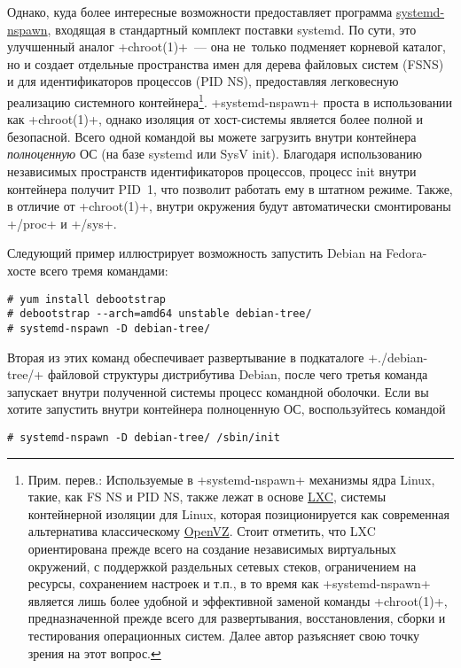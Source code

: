 \documentclass[10pt,oneside,a4paper]{article}
\begin{document}
Однако, куда более интересные возможности предоставляет программа
\href{http://0pointer.de/public/systemd-man/systemd-nspawn.html}{systemd-nspawn},
входящая в стандартный комплект поставки systemd. По сути, это улучшенный аналог
+chroot(1)+~--- она не~только подменяет корневой каталог, но и создает отдельные
пространства имен для дерева файловых систем (FSNS) и для идентификаторов
процессов (PID NS), предоставляя легковесную реализацию системного
контейнера\footnote{Прим. перев.: Используемые в +systemd-nspawn+ механизмы 
ядра Linux, такие, как FS NS и PID NS, также лежат в основе
\href{http://lxc.sourceforge.net/}{LXC}, системы контейнерной изоляции для
Linux, которая позиционируется как современная альтернатива классическому
\href{http://wiki.openvz.org/Main_Page}{OpenVZ}. Стоит отметить, что LXC 
ориентирована прежде всего на создание независимых виртуальных окружений,
с поддержкой раздельных сетевых стеков, ограничением на ресурсы, сохранением
настроек и т.п., в то время как +systemd-nspawn+ является лишь более удобной и
эффективной заменой команды +chroot(1)+, предназначенной прежде всего для
развертывания, восстановления, сборки и тестирования операционных систем. Далее
автор разъясняет свою точку зрения на этот вопрос.}.
+systemd-nspawn+ проста в использовании как +chroot(1)+, однако изоляция
от хост-системы является более полной и безопасной. Всего одной командой
вы можете загрузить внутри контейнера \emph{полноценную} ОС (на базе systemd
или SysV init). Благодаря использованию независимых пространств идентификаторов
процессов, процесс init внутри контейнера получит PID~1, что позволит работать
ему в штатном режиме. Также, в отличие от +chroot(1)+, внутри окружения 
будут автоматически смонтированы +/proc+ и +/sys+.

Следующий пример иллюстрирует возможность запустить Debian на Fedora-хосте
всего тремя командами:
\begin{Verbatim}
# yum install debootstrap
# debootstrap --arch=amd64 unstable debian-tree/
# systemd-nspawn -D debian-tree/
\end{Verbatim}

Вторая из этих команд обеспечивает развертывание в подкаталоге +./debian-tree/+
файловой структуры дистрибутива Debian, после чего третья команда запускает
внутри полученной системы процесс командной оболочки. Если вы хотите запустить
внутри контейнера полноценную ОС, воспользуйтесь командой
\begin{Verbatim}
# systemd-nspawn -D debian-tree/ /sbin/init
\end{Verbatim}
\end{document}
